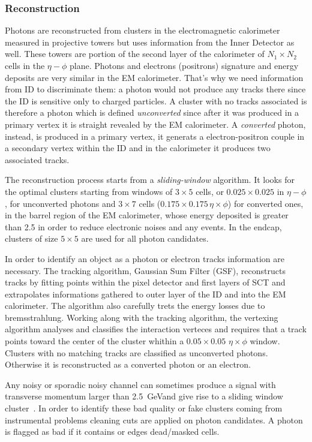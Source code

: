\subsubsection{Reconstruction}
Photons are reconstructed from clusters in the electromagnetic calorimeter measured in projective towers but uses information from the Inner Detector as well. These towers are portion of the second layer of the calorimeter of $N_1 \times N_2$ cells in the $\eta-\phi$ plane. Photons and electrons (positrons) signature and energy deposits are very similar in the EM calorimeter. That's why we need information from ID to discriminate them: a photon would not produce any tracks there since the ID is sensitive only to charged particles. A cluster with no tracks associated is therefore a photon which is defined \emph{unconverted} since after it was produced in a primary vertex it is straight revealed by the EM calorimeter. A \emph{converted} photon, instead, is produced in a primary vertex, it generats a electron-positron couple in a secondary vertex within the ID and in the calorimeter it produces two associated tracks.

The reconstruction process starts from a \emph{sliding-window} algorithm. It looks for the optimal clusters starting from windows of $3\times5$ cells, or $0.025\times0.025$ in $\eta-\phi$, for unconverted photons and $3\times7$ cells ($0.175\times0.175 \, \eta\times\phi$) for converted ones, in the barrel region of the EM calorimeter, whose energy deposited is greater than \SI{2.5}{\gev} in order to reduce electronic noises and any \pileup events. In the endcap, clusters of size $5\times5$ are used for all photon candidates.

In order to identify an object as a photon or electron tracks information are necessary. The tracking algorithm, Gaussian Sum Filter (GSF), reconstructs tracks by fitting points within the pixel detector and first layers of SCT and extrapolates informations gathered to outer layer of the ID and into the EM calorimeter. The algorithm also carefully trets the energy losses due to bremsstrahlung. Working along with the tracking algorithm, the vertexing algorithm analyses and classifies the interaction verteces and requires that a track points toward the center of the cluster whithin a $0.05\times0.05$ $\eta\times\phi$ window. Clusters with no matching tracks are classified as unconverted photons. Otherwise it is reconstructed as a converted photon or an electron.

Any noisy or sporadic noisy channel can sometimes produce a signal with transverse momentum larger than \SI{2.5}{\GeV }and give rise to a sliding window cluster~\cite{photons}. In order to identify these bad quality or fake clusters coming from instrumental problems cleaning cuts are applied on photon candidates. A photon is flagged as bad if it contains or edges dead/masked cells.


